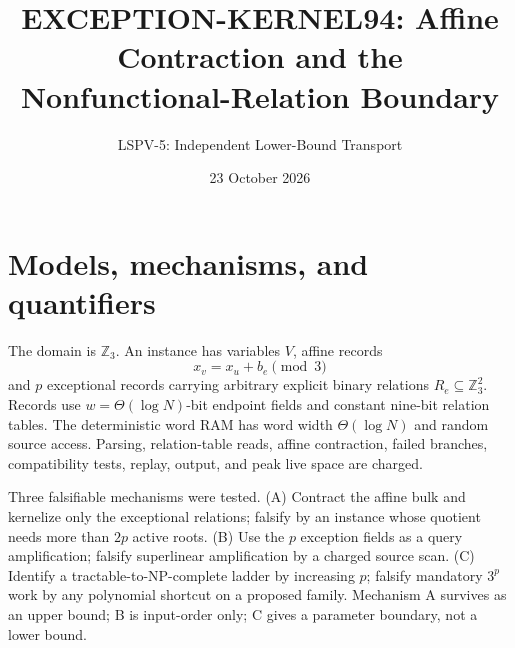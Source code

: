 \documentclass[11pt]{article}
\title{EXCEPTION-KERNEL94: Affine Contraction and the Nonfunctional-Relation Boundary}
\author{LSPV-5: Independent Lower-Bound Transport}
\date{23 October 2026}
\begin{document}
\maketitle
\begin{center}
\end{center}

\section{Models, mechanisms, and quantifiers}
The domain is $\mathbb Z_3$. An instance has variables $V$, affine records
\[
x_v=x_u+b_e\pmod 3
\]
and $p$ exceptional records carrying arbitrary explicit binary relations
$R_e\subseteq\mathbb Z_3^2$. Records use $w=\Theta(\log N)$-bit endpoint
fields and constant nine-bit relation tables. The deterministic word RAM has
word width $\Theta(\log N)$ and random source access. Parsing, relation-table
reads, affine contraction, failed branches, compatibility tests, replay,
output, and peak live space are charged.

Three falsifiable mechanisms were tested. (A) Contract the affine bulk and
kernelize only the exceptional relations; falsify by an instance whose
quotient needs more than $2p$ active roots. (B) Use the $p$ exception fields
as a query amplification; falsify superlinear amplification by a charged
source scan. (C) Identify a tractable-to-NP-complete ladder by increasing
$p$; falsify mandatory $3^p$ work by any polynomial shortcut on a proposed
family. Mechanism A survives as an upper bound; B is input-order only; C
gives a parameter boundary, not a lower bound.
\end{document}
